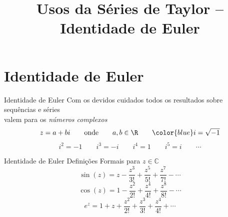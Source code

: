 
\usepackage{integracao_e_series}

\title{Usos da Séries de Taylor -- Identidade de Euler}



\addtitle

\section{Identidade de Euler}

\begin{frame}{Identidade de Euler}
  Com os devidos cuidados todos os resultados sobre sequências e séries\\
  valem para os \emph{números complexos}
  \vspace{\baselineskip}
  \[
    z = a + bi \qquad \text{onde} \qquad a, b \in \R \qquad {\color{blue}i=\sqrt{-1}}
  \]
  \pause
  \vspace{0.5\baselineskip}
  \[
    i^2 = -1 \qquad i^3 = -i \qquad i^4 = 1 \qquad i^5 = i \qquad \cdots
  \]
\end{frame}

\begin{frame}{Identidade de Euler}
Definições Formais para $z\in\mathbb{C}$
\pause
\[
  \sin(z) = z - \frac{z^3}{3!} + \frac{z^5}{5!} + \frac{z^7}{7!} - \cdots
\]
\pause
\[
  \cos(z) = 1 - \frac{z^2}{2!} + \frac{z^4}{4!} + \frac{z^8}{8!} - \cdots
\]
\pause
\[
  e^z = 1 + z + \frac{z^2}{2!} + \frac{z^3}{3!} + \frac{z^4}{4!} +  \cdots
\]
\end{frame}

